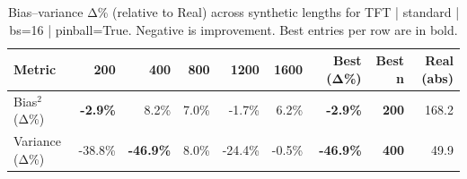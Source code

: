 \renewcommand{\arraystretch}{1.2}
\begin{table}[!t]
\centering
\footnotesize
\caption{Bias–variance Δ\% (relative to Real) across synthetic lengths for TFT | standard | bs=16 | pinball=True. Negative is improvement. Best entries per row are in bold.}
\label{tab:bvdelta_TFT_standard_bs16_pinballTrue}
\setlength{\tabcolsep}{5pt}
\begin{tabular}{lrrrrrrrr}
\toprule
Metric & 200 & 400 & 800 & 1200 & 1600 & Best (Δ\%) & Best n & Real (abs) \\
\midrule
Bias$^2$ (Δ\%) & \textbf{-2.9\%} & 8.2\% & 7.0\% & -1.7\% & 6.2\% & \textbf{-2.9\%} & \textbf{200} & 168.2 \\
Variance (Δ\%) & -38.8\% & \textbf{-46.9\%} & 8.0\% & -24.4\% & -0.5\% & \textbf{-46.9\%} & \textbf{400} & 49.9 \\
\bottomrule
\end{tabular}

\end{table}
